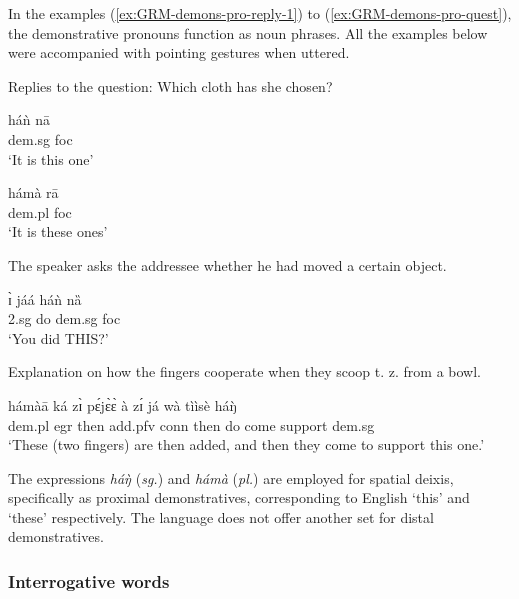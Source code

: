 \begin{exe}
\begin{exe}
\begin{exe}
{\begin{exe}
\begin{exe}
\begin{exe}
\begin{exe}
\begin{exe}
\begin{exe}
\begin{exe}
\begin{xlist}
\begin{exe}
In the examples (\ref{ex:GRM-demons-pro-reply-1}) to
(\ref{ex:GRM-demons-pro-quest}),  the demonstrative pronouns  
function as noun phrases. All the examples below were accompanied with
 pointing gestures when uttered.



\ea\label{ex:GRM-demons-pro-reply-1}{\rm Replies to the question: Which cloth
has she chosen?}
 
 
  \ea\label{ex:GRM-demons-pro-reply-1sg} 
 \gll háǹ nā\\
   {\sc dem.sg} {\sc foc}\\
 \glt `It is this one' 
   
      \ex\label{ex:GRM-demons-pro-reply-1pl}
       \gll hámà rā\\
   {\sc dem.pl} {\sc foc}\\
 \glt `It is these ones' 
 
\z 
 \z



\ea\label{ex:GRM-demons-pro-quest}{\rm The speaker asks the addressee whether 
he had moved a certain object.} 

 \gll   ɪ̀ jáá háǹ nȁ\\
  {\sc 2.sg} do {\sc dem.sg}  {\sc foc}\\
 \glt `You did THIS?' 

\z


\ea\label{ex:GRM-demons-pro-quest}{\rm Explanation on how the fingers cooperate
when they scoop t. z. from a bowl.}

 \gll hámàā ká zɪ̀ pɛ́jɛ̀ɛ̀ à zɪ́ já wà tììsè  háŋ̀\\
 {\sc dem.pl} {\sc egr} then add.{\sc pfv} {\sc conn}  then do come support {\sc
dem.sg} \\
 
\glt `These (two fingers) are then added,
and then they come to support  this one.' 

\z



The expressions {\it háŋ̀} ({\it sg.}) and {\it hámà}
({\it pl.}) are employed for spatial deixis, specifically as proximal
demonstratives, corresponding to English `this' and `these' respectively. The
language does not offer another set for distal demonstratives.



\subsubsection{Interrogative words}
\label{sec:GRM-interg-pro}



\end{exe}
\end{xlist}
\end{exe}
\end{exe}
\end{exe}
\end{exe}
\end{exe}
\end{exe}
\end{exe}}
\end{exe}
\end{exe}
\end{exe}
